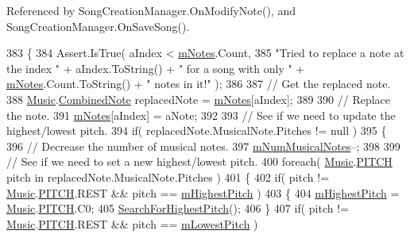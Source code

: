 Referenced by Song\+Creation\+Manager.\+On\+Modify\+Note(), and Song\+Creation\+Manager.\+On\+Save\+Song().


\begin{DoxyCode}
383     \{
384         Assert.IsTrue( aIndex < \hyperlink{group___song_priv_var_ga674bc904a1f856d485d5fb7fe84bac85}{mNotes}.Count,
385              \textcolor{stringliteral}{"Tried to replace a note at the index "} + aIndex.ToString() + \textcolor{stringliteral}{" for a song with only "} + 
      \hyperlink{group___song_priv_var_ga674bc904a1f856d485d5fb7fe84bac85}{mNotes}.Count.ToString() + \textcolor{stringliteral}{" notes in it!"} );
386 
387         \textcolor{comment}{// Get the replaced note.}
388         \hyperlink{class_music}{Music}.\hyperlink{group___music_structs_struct_music_1_1_combined_note}{CombinedNote} replacedNote = \hyperlink{group___song_priv_var_ga674bc904a1f856d485d5fb7fe84bac85}{mNotes}[aIndex];
389 
390         \textcolor{comment}{// Replace the note.}
391         \hyperlink{group___song_priv_var_ga674bc904a1f856d485d5fb7fe84bac85}{mNotes}[aIndex] = aNote;
392 
393         \textcolor{comment}{// See if we need to update the highest/lowest pitch.}
394         \textcolor{keywordflow}{if}( replacedNote.MusicalNote.Pitches != null )
395         \{
396             \textcolor{comment}{// Decrease the number of musical notes.}
397             \hyperlink{group___song_priv_var_gaf55b4fd2df0457ba1306a75ac3fdc8b1}{mNumMusicalNotes}--;
398 
399             \textcolor{comment}{// See if we need to set a new highest/lowest pitch.}
400             \textcolor{keywordflow}{foreach}( \hyperlink{class_music}{Music}.\hyperlink{group___music_enums_ga508f69b199ea518f935486c990edac1d}{PITCH} pitch in replacedNote.MusicalNote.Pitches )
401             \{
402                 \textcolor{keywordflow}{if}( pitch != \hyperlink{class_music}{Music}.\hyperlink{group___music_enums_ga508f69b199ea518f935486c990edac1d}{PITCH}.REST && pitch == 
      \hyperlink{group___song_priv_var_ga2dcd39d9add609e9df56a94057441dcc}{mHighestPitch} )
403                 \{
404                     \hyperlink{group___song_priv_var_ga2dcd39d9add609e9df56a94057441dcc}{mHighestPitch} = \hyperlink{class_music}{Music}.\hyperlink{group___music_enums_ga508f69b199ea518f935486c990edac1d}{PITCH}.C0;
405                     \hyperlink{group___song_priv_func_ga5f837e6b7f576732fa38747caa057621}{SearchForHighestPitch}();
406                 \}
407                 \textcolor{keywordflow}{if}( pitch != \hyperlink{class_music}{Music}.\hyperlink{group___music_enums_ga508f69b199ea518f935486c990edac1d}{PITCH}.REST && pitch == \hyperlink{group___song_priv_var_ga293976ef4c2050687a81edfbf77b4fc1}{mLowestPitch} )

\end{DoxyCode}
